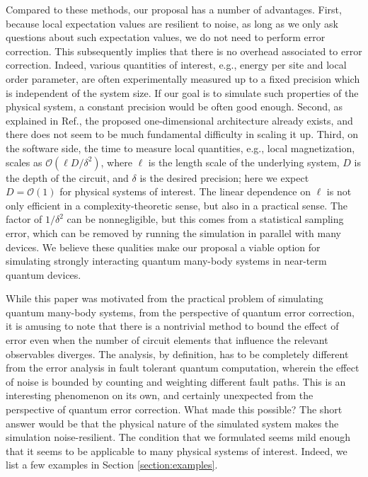 \documentclass[prx,aps,amsmath,amssymb,floatfix,superscriptaddress,11pt,tightenlines,longbibliography,onecolumn,notitlepage]{revtex4-1}
\begin{document}
Compared to these methods, our proposal\cite{Kim2017a} has a number of advantages. First, because local expectation values are resilient to noise, as long as we only ask questions about such expectation values, we do not need to perform error correction. This subsequently implies that there is no overhead associated to error correction. Indeed, various quantities of interest, e.g., energy per site and local order parameter, are often experimentally measured up to a fixed precision which is independent of the system size. If our goal is to simulate such properties of the physical system, a constant precision would be often good enough. Second, as explained in Ref.\cite{Kim2017a}, the proposed one-dimensional architecture already exists\cite{Kim2010,Barends2014}, and there does not seem to be much fundamental difficulty in scaling it up. Third, on the software side, the time to measure local quantities, e.g., local magnetization, scales as $\mathcal{O}(\ell D /\delta^2)$, where $\ell$ is the length scale of the underlying system, $D$ is the depth of the circuit, and $\delta$ is the desired precision; here we expect $D=\mathcal{O}(1)$ for physical systems of interest. The linear dependence on $\ell$ is not only efficient in a complexity-theoretic sense, but also in a practical sense. The factor of $1/\delta^2$ can be nonnegligible, but this comes from a statistical sampling error, which can be removed by running the simulation in parallel with many devices. We believe these qualities make our proposal a viable option for simulating strongly interacting quantum many-body systems in near-term quantum devices.

While this paper was motivated from the practical problem of simulating quantum many-body systems, from the perspective of quantum error correction, it is amusing to note that there is a nontrivial method to bound the effect of error even when the number of circuit elements that influence the relevant observables diverges. The analysis, by definition, has to be completely different from the error analysis in fault tolerant quantum computation, wherein the effect of noise is bounded by counting and weighting different fault paths\cite{Aharonov1996}. This is an interesting phenomenon on its own, and certainly unexpected from the perspective of quantum error correction. What made this possible? The short answer would be that the physical nature of the simulated system makes the simulation noise-resilient. The condition that we formulated seems mild enough that it seems to be applicable to many physical systems of interest. Indeed, we list a few examples in Section \ref{section:examples}.
\end{document}
